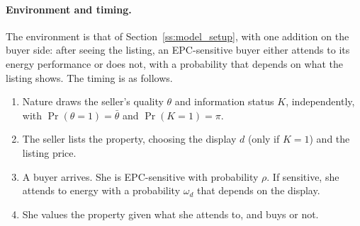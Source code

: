 \paragraph{Environment and timing.}
The environment is that of Section~\ref{ss:model_setup}, with one addition on the buyer side: after seeing the listing, an EPC-sensitive buyer either attends to its energy performance or does not, with a probability that depends on what the listing shows. The timing is as follows.
\begin{enumerate}[label=(\arabic*)]
    \item Nature draws the seller's quality $\theta$ and information status $K$, independently, with $\Pr(\theta=1)=\bar\theta$ and $\Pr(K=1)=\pi$.
    \item The seller lists the property, choosing the display $d$ (only if $K=1$) and the listing price.
    \item A buyer arrives. She is EPC-sensitive with probability $\rho$. If sensitive, she attends to energy with a probability $\omega_d$ that depends on the display.
    \item She values the property given what she attends to, and buys or not.
\end{enumerate}
